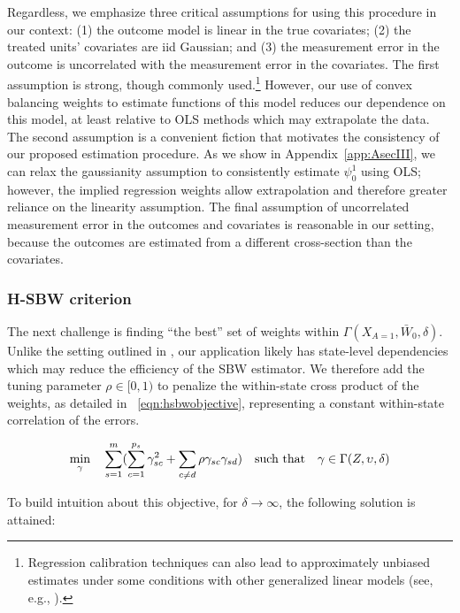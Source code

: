 \documentclass[aoas]{imsart}
\theoremstyle{plain}
\theoremstyle{remark}
\begin{document}
Regardless, we emphasize three critical assumptions for using this procedure in our context: (1) the outcome model is linear in the true covariates; (2) the treated units' covariates are iid Gaussian; and (3) the measurement error in the outcome is uncorrelated with the measurement error in the covariates. The first assumption is strong, though commonly used.\footnote{Regression calibration techniques can also lead to approximately unbiased estimates under some conditions with other generalized linear models (see, e.g., \cite{spiegelman2001efficient}).} However, our use of convex balancing weights to estimate functions of this model reduces our dependence on this model, at least relative to OLS methods which may extrapolate the data. The second assumption is a convenient fiction that motivates the consistency of our proposed estimation procedure. As we show in Appendix~\ref{app:AsecIII}, we can relax the gaussianity assumption to consistently estimate $\psi_0^1$ using OLS; however, the implied regression weights allow extrapolation and therefore greater reliance on the linearity assumption. The final assumption of uncorrelated measurement error in the outcomes and covariates is reasonable in our setting, because the outcomes are estimated from a different cross-section than the covariates. 
 
\subsubsection{H-SBW criterion}\label{sssec:hsbw}

The next challenge is finding ``the best'' set of weights within $\Gamma(X_{A=1}, \bar{W}_0, \delta)$. Unlike the setting outlined in \cite{zubizarreta2015stable}, our application likely has state-level dependencies which may reduce the efficiency of the SBW estimator. We therefore add the tuning parameter $\rho \in [0, 1)$ to penalize the within-state cross product of the weights, as detailed in ~\eqref{eqn:hsbwobjective}, representing a constant within-state correlation of the errors.

\begin{equation}\label{eqn:hsbwobjective}
\min_{\gamma} \quad \sum_{s=1}^{m}(\sum_{c = 1}^{p_s}\gamma_{sc}^2 + \sum_{c \ne d}\rho \gamma_{sc}\gamma_{sd}) \quad \text{such that} \quad \gamma \in \Gamma(Z, \upsilon, \delta)\\
\end{equation}

To build intuition about this objective, for $\delta \to \infty$, the following solution is attained:
\end{document}
